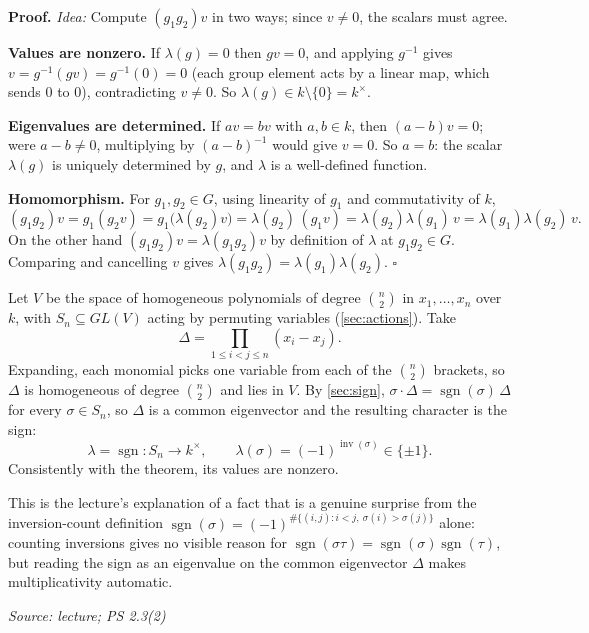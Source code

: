 \documentclass[11pt]{report}
\newcommand{\sgn}{\operatorname{sgn}}
\renewenvironment{proof}[1][Proof]{\noindent\textbf{#1.} }{\hfill$\square$\par\vspace{5pt}}
\newcommand{\srcline}[1]{\par\hfill{\footnotesize\textit{Source: #1}}}
\begin{document}
\begin{proof}
\textit{Idea:} Compute $(g_1g_2)v$ in two ways; since $v \neq 0$, the scalars must agree.\par
\textbf{Values are nonzero.} If $\lambda(g) = 0$ then $gv = 0$, and applying $g^{-1}$ gives $v = g^{-1}(gv) = g^{-1}(0) = 0$ (each group element acts by a linear map, which sends $0$ to $0$), contradicting $v \neq 0$. So $\lambda(g) \in k \setminus \{0\} = k^\times$.

\textbf{Eigenvalues are determined.} If $av = bv$ with $a, b \in k$, then $(a - b)v = 0$; were $a - b \neq 0$, multiplying by $(a-b)^{-1}$ would give $v = 0$. So $a = b$: the scalar $\lambda(g)$ is uniquely determined by $g$, and $\lambda$ is a well-defined function.

\textbf{Homomorphism.} For $g_1, g_2 \in G$, using linearity of $g_1$ and commutativity of $k$,
\[ (g_1 g_2)v = g_1(g_2 v) = g_1\big(\lambda(g_2) v\big) = \lambda(g_2)\,(g_1 v) = \lambda(g_2)\lambda(g_1)\, v = \lambda(g_1)\lambda(g_2)\,v. \]
On the other hand $(g_1g_2)v = \lambda(g_1g_2)v$ by definition of $\lambda$ at $g_1 g_2 \in G$. Comparing and cancelling $v$ gives $\lambda(g_1 g_2) = \lambda(g_1)\lambda(g_2)$.
\end{proof}

\begin{exbox}\label{ex:delta-sign-character}
Let $V$ be the space of homogeneous polynomials of degree $\binom{n}{2}$ in $x_1, \ldots, x_n$ over $k$, with $S_n \subseteq GL(V)$ acting by permuting variables (\ref{sec:actions}). Take
\[ \Delta = \prod_{1 \leq i < j \leq n}(x_i - x_j). \]
Expanding, each monomial picks one variable from each of the $\binom{n}{2}$ brackets, so $\Delta$ is homogeneous of degree $\binom{n}{2}$ and lies in $V$. By \ref{sec:sign}, $\sigma \cdot \Delta = \sgn(\sigma)\,\Delta$ for every $\sigma \in S_n$, so $\Delta$ is a common eigenvector and the resulting character is the sign:
\[ \lambda = \sgn: S_n \to k^\times, \qquad \lambda(\sigma) = (-1)^{\operatorname{inv}(\sigma)} \in \{\pm 1\}. \]
Consistently with the theorem, its values are nonzero.

This is the lecture's explanation of a fact that is a genuine surprise from the inversion-count definition $\sgn(\sigma) = (-1)^{\#\{(i,j) : i < j,\ \sigma(i) > \sigma(j)\}}$ alone: counting inversions gives no visible reason for $\sgn(\sigma\tau) = \sgn(\sigma)\sgn(\tau)$, but reading the sign as an eigenvalue on the common eigenvector $\Delta$ makes multiplicativity automatic.
\srcline{lecture; PS 2.3(2)}
\end{exbox}
\end{document}
